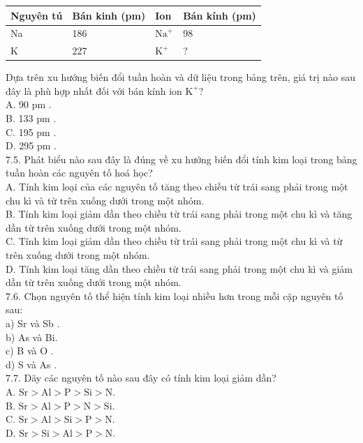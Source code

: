 \documentclass[10pt]{article}
\begin{document}
\begin{center}
\begin{tabular}{|l|l|l|l|}
\hline
Nguyên tú & Bán kinh (pm) & Ion & Bán kính (pm) \\
\hline
Na & 186 & $\mathrm{Na}^{+}$ & 98 \\
\hline
K & 227 & $\mathrm{K}^{+}$ & ? \\
\hline
\end{tabular}
\end{center}

Dựa trên xu hướng biến đổi tuần hoàn và dữ liệu trong bảng trên, giá trị nào sau đây là phù hợp nhất đối với bán kính ion $\mathrm{K}^{+}$?\\
A. 90 pm .\\
B. 133 pm .\\
C. 195 pm .\\
D. 295 pm .\\
7.5. Phát biểu nào sau đây là đúng về xu hướng biến đổi tính kim loại trong bảng tuần hoàn các nguyên tố hoá học?\\
A. Tính kim loại của các nguyên tố tăng theo chiều từ trái sang phải trong một chu kì và từ trên xuống dưới trong một nhóm.\\
B. Tính kim loại giảm dần theo chiều từ trái sang phải trong một chu kì và tăng dần từ trên xuống dưới trong một nhóm.\\
C. Tính kim loại giảm dần theo chiều từ trái sang phải trong một chu kì và từ trên xuống dưới trong một nhóm.\\
D. Tính kim loại tăng dần theo chiều từ trái sang phải trong một chu kì và giảm dần từ trên xuống dưới trong một nhóm.\\
7.6. Chọn nguyên tố thể hiện tính kim loại nhiều hơn trong mỗi cặp nguyên tố sau:\\
a) Sr và Sb .\\
b) As và Bi.\\
c) B và O .\\
d) S và As .\\
7.7. Dãy các nguyên tố nào sau đây có tính kim loại giảm dần?\\
A. $\mathrm{Sr}>\mathrm{Al}>\mathrm{P}>\mathrm{Si}>\mathrm{N}$.\\
B. $\mathrm{Sr}>\mathrm{Al}>\mathrm{P}>\mathrm{N}>\mathrm{Si}$.\\
C. $\mathrm{Sr}>\mathrm{Al}>\mathrm{Si}>\mathrm{P}>\mathrm{N}$.\\
D. $\mathrm{Sr}>\mathrm{Si}>\mathrm{Al}>\mathrm{P}>\mathrm{N}$.\\
\end{document}
